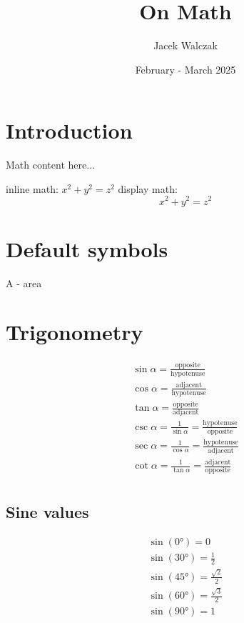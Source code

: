 \documentclass{article}
\title{On Math}
\author{Jacek Walczak}
\date{February - March 2025}
\begin{document}
\maketitle

\section{Introduction}
Math content here...

inline math: $x^2 + y^2 = z^2$
display math: \begin{equation}x^2 + y^2 = z^2 \end{equation}

\section{Default symbols}

A - area

\section{Trigonometry}

\begin{equation}
  \begin{gathered}
    \sin\alpha = \frac{\text{opposite}}{\text{hypotenuse}} \\
    \cos\alpha = \frac{\text{adjacent}}{\text{hypotenuse}} \\
    \tan\alpha = \frac{\text{opposite}}{\text{adjacent}} \\
    \csc\alpha = \frac{1}{\sin{\alpha}} =
    \frac{\text{hypotenuse}}{\text{opposite}} \\
    \sec\alpha = \frac{1}{\cos{\alpha}} =
    \frac{\text{hypotenuse}}{\text{adjacent}} \\
    \cot\alpha = \frac{1}{\tan{\alpha}} =
    \frac{\text{adjacent}}{\text{opposite}} \\
  \end{gathered}
\end{equation}

\subsection{Sine values}
\begin{equation}
  \begin{gathered}
    \sin(0°) = 0 \\
    \sin(30°) = \frac{1}{2} \\
    \sin(45°) = \frac{\sqrt{2}}{2} \\
    \sin(60°) = \frac{\sqrt{3}}{2} \\
    \sin(90°) = 1
  \end{gathered}
\end{equation}
\end{document}
